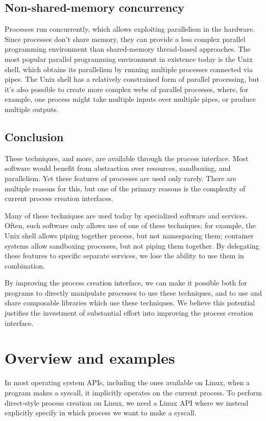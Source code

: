 \documentclass{acmart}
\begin{document}
\subsection{Non-shared-memory concurrency}
Processes run concurrently,
which allows exploiting parallelism in the hardware.
Since processes don't share memory,
they can provide a less complex parallel programming environment
than shared-memory thread-based approaches.
The most popular parallel programming environment in existence today is the Unix shell,
which obtains its parallelism by running multiple processes connected via pipes.
The Unix shell has a relatively constrained form of parallel processing,
but it's also possible to create more complex webs of parallel processes,
where, for example, one process might take multiple inputs over multiple pipes,
or produce multiple outputs.
\subsection{Conclusion}
These techniques, and more, are available through the process interface.
Most software would benefit from abstraction over resources, sandboxing, and parallelism.
Yet these features of processes are used only rarely.
There are multiple reasons for this,
but one of the primary reasons is the complexity of current process creation interfaces.

Many of these techniques are used today by specialized software and services.
Often, such software only allows use of one of these techniques;
for example, the Unix shell allows piping together process, but not namespacing them;
container systems allow sandboxing processes, but not piping them together.
By delegating these features to specific separate services,
we lose the ability to use them in combination.

By improving the process creation interface,
we can make it possible both for programs to directly manipulate processes to use these techniques,
and to use and share composable libraries which use these techniques.
We believe this potential justifies the investment of substantial effort
into improving the process creation interface.
\section{Overview and examples}\label{examples}
In most operating system APIs, including the ones available on Linux,
when a program makes a syscall, it implicitly operates on the current process.
To perform direct-style process creation on Linux,
we need a Linux API where we instead explicitly specify in which process we want to make a syscall.
\end{document}
